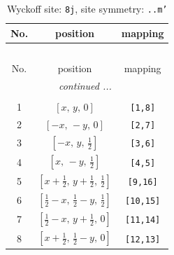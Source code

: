 \documentclass[fleqn,8pt]{jsarticle}
\begin{document}
\begin{longtable}{ccc}
\caption{Wyckoff site: {\tt 8j}, site symmetry: {\tt ..m'}}
 \\
 \hline \hline
No. & position & mapping \\ \hline \endfirsthead

\multicolumn{2}{l}{\tablename\ \thetable{}} \\
 \hline \hline
No. & position & mapping \\ \hline \endhead

 \hline \hline
\multicolumn{2}{r}{\footnotesize\it continued ...} \\ \endfoot

 \hline \hline
\multicolumn{2}{r}{} \\ \endlastfoot

1 & $\left[ x,\, y,\, 0 \right]$ & {\tt [1,8]} \\ \hline
2 & $\left[ - x,\, - y,\, 0 \right]$ & {\tt [2,7]} \\ \hline
3 & $\left[ - x,\, y,\, \frac{1}{2} \right]$ & {\tt [3,6]} \\ \hline
4 & $\left[ x,\, - y,\, \frac{1}{2} \right]$ & {\tt [4,5]} \\ \hline
5 & $\left[ x + \frac{1}{2},\, y + \frac{1}{2},\, \frac{1}{2} \right]$ & {\tt [9,16]} \\ \hline
6 & $\left[ \frac{1}{2} - x,\, \frac{1}{2} - y,\, \frac{1}{2} \right]$ & {\tt [10,15]} \\ \hline
7 & $\left[ \frac{1}{2} - x,\, y + \frac{1}{2},\, 0 \right]$ & {\tt [11,14]} \\ \hline
8 & $\left[ x + \frac{1}{2},\, \frac{1}{2} - y,\, 0 \right]$ & {\tt [12,13]} \\
\end{longtable}
\renewcommand{\arraystretch}{1.2}
\end{document}

